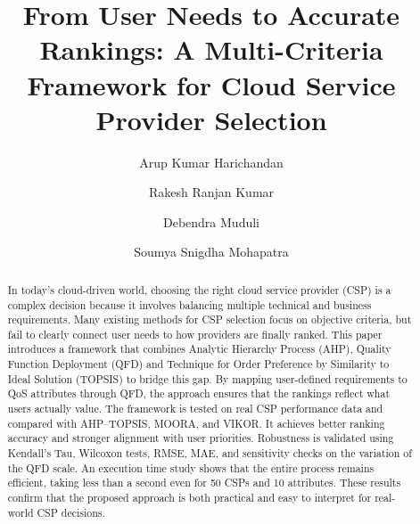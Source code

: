 \documentclass[twocolumn]{svjour3}
\begin{document}
\title{From User Needs to Accurate Rankings: A Multi-Criteria Framework for Cloud Service Provider Selection}


\author{
Arup Kumar Harichandan \and
Rakesh Ranjan Kumar \and
Debendra Muduli \and
Soumya Snigdha Mohapatra
}


\date{}


\maketitle

\begin{abstract}
In today’s cloud-driven world, choosing the right cloud service provider (CSP) is a complex decision because it involves balancing multiple technical and business requirements. Many existing methods for CSP selection focus on objective criteria, but fail to clearly connect user needs to how providers are finally ranked. This paper introduces a framework that combines Analytic Hierarchy Process (AHP), Quality Function Deployment (QFD) and Technique for Order Preference by Similarity to Ideal Solution (TOPSIS) to bridge this gap. By mapping user-defined requirements to QoS attributes through QFD, the approach ensures that the rankings reflect what users actually value. The framework is tested on real CSP performance data and compared with AHP--TOPSIS, MOORA, and VIKOR. It achieves better ranking accuracy and stronger alignment with user priorities. Robustness is validated using Kendall’s Tau, Wilcoxon tests, RMSE, MAE, and sensitivity checks on the variation of the QFD scale. An execution time study shows that the entire process remains efficient, taking less than a second even for 50 CSPs and 10 attributes. These results confirm that the proposed approach is both practical and easy to interpret for real-world CSP decisions.
\end{abstract}
\end{document}

